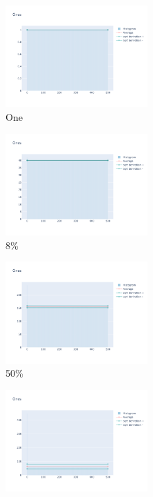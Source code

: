 \documentclass[12pt, fleqn]{report}                             %
\theoremstyle{break}                                            %
\begin{document}
      \begin{figure}[ht!]
        \centering
        \begin{subfigure}[b]{0.4\linewidth}
          \includegraphics[width=0.6\textwidth]{Images/74/dia-a.png}
          \caption{One}
        \end{subfigure}
        \begin{subfigure}[b]{0.4\linewidth}
          \includegraphics[width=0.6\textwidth]{Images/74/dia-b.png}
          \caption{8\%}
        \end{subfigure}
        \begin{subfigure}[b]{0.4\linewidth}
          \includegraphics[width=0.6\textwidth]{Images/74/dia-c.png}
          \caption{50\%}
        \end{subfigure}
        \begin{subfigure}[b]{0.4\linewidth}
          \includegraphics[width=0.6\textwidth]{Images/74/dia-d.png}

\end{subfigure}
\end{figure}
\end{document}
